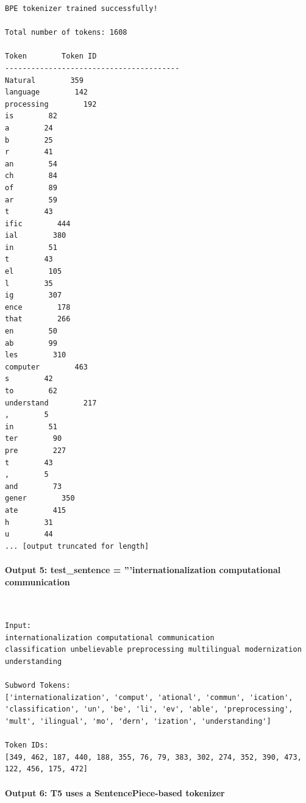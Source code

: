 \documentclass[12pt,a4paper,oneside]{report}
\begin{document}
\begin{Verbatim}[commandchars=\\\{\},breaklines=true,breakanywhere=true,fontsize=\scriptsize,frame=leftline,framesep=2mm,rulecolor=\color{gray}]
BPE tokenizer trained successfully!

Total number of tokens: 1608

Token        Token ID
----------------------------------------
Natural        359
language        142
processing        192
is        82
a        24
b        25
r        41
an        54
ch        84
of        89
ar        59
t        43
ific        444
ial        380
in        51
t        43
el        105
l        35
ig        307
ence        178
that        266
en        50
ab        99
les        310
computer        463
s        42
to        62
understand        217
,        5
in        51
ter        90
pre        227
t        43
,        5
and        73
gener        350
ate        415
h        31
u        44
... [output truncated for length]
\end{Verbatim}
\paragraph{Output 5: test\_sentence = '''internationalization computational communication}\mbox{}\\[-1ex]
\begin{Verbatim}[commandchars=\\\{\},breaklines=true,breakanywhere=true,fontsize=\scriptsize,frame=leftline,framesep=2mm,rulecolor=\color{gray}]
Input:
internationalization computational communication
classification unbelievable preprocessing multilingual modernization understanding

Subword Tokens:
['internationalization', 'comput', 'ational', 'commun', 'ication', 'classification', 'un', 'be', 'li', 'ev', 'able', 'preprocessing', 'mult', 'ilingual', 'mo', 'dern', 'ization', 'understanding']

Token IDs:
[349, 462, 187, 440, 188, 355, 76, 79, 383, 302, 274, 352, 390, 473, 122, 456, 175, 472]
\end{Verbatim}
\paragraph{Output 6: T5 uses a SentencePiece-based tokenizer}\mbox{}\\[-1ex]
\end{document}
